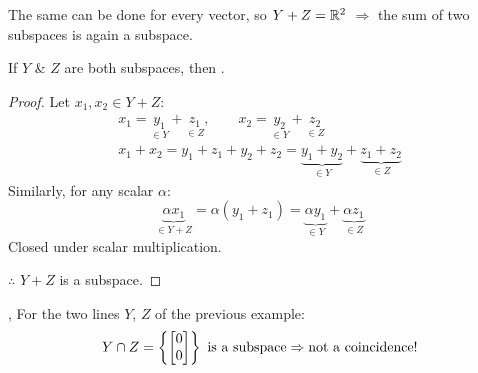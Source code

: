 \begin{example}
\begin{minipage}{\linewidth}
\begin{center}
\end{center}
\end{minipage}\par
The same can be done for every vector, so $Y+Z = \mathbb{R}^2$ $\Rightarrow$ the sum of two subspaces is again a subspace.
\end{example}

\begin{remark}
If $Y$ \& $Z$ are both subspaces, then .
\end{remark}
\begin{proof}
Let $x_1, x_2\in Y+Z$:
\begin{gather*}
x_1 = \underset{\in Y}{y_1}+\underset{\in Z}{z_1}, \qquad x_2 = \underset{\in Y}{y_2}+\underset{\in Z}{z_2}\\[6pt]
x_1+x_2 = y_1+z_1+y_2+z_2 = \underbrace{y_1+y_2}_{\in Y}+\underbrace{z_1+z_2}_{\in Z}
\end{gather*}
Similarly, for any scalar $\alpha$:
\[
\underbrace{\alpha x_1}_{\in Y+Z} = \alpha(y_1+z_1) = \underbrace{\alpha y_1}_{\in Y}+\underbrace{\alpha z_1}_{\in Z}
\]
Closed under scalar multiplication.

$\therefore$ $Y+Z$ is a subspace.
\end{proof}

\sep
For the two lines $Y$, $Z$ of the previous example:
\[ Y\cap Z = \left\{\begin{bmatrix}0\\0\end{bmatrix}\right\} \text{ is a subspace} \Rightarrow \text{not a coincidence!} \]


